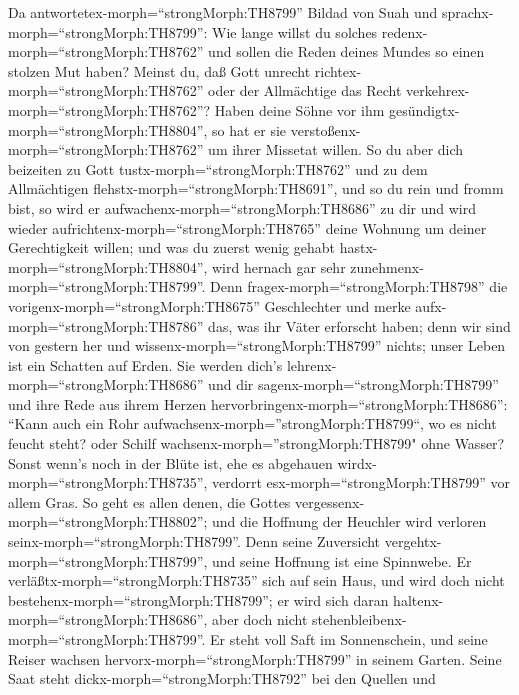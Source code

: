  Da antwortetex-morph=``strongMorph:TH8799'' Bildad von Suah
und sprachx-morph=``strongMorph:TH8799'':  Wie lange willst
du solches redenx-morph=``strongMorph:TH8762'' und sollen die Reden
deines Mundes so einen stolzen Mut haben?  Meinst du, daß
Gott unrecht richtex-morph=``strongMorph:TH8762'' oder der Allmächtige
das Recht verkehrex-morph=``strongMorph:TH8762''?  Haben
deine Söhne vor ihm gesündigtx-morph=``strongMorph:TH8804'', so hat er
sie verstoßenx-morph=``strongMorph:TH8762'' um ihrer Missetat willen.
 So du aber dich beizeiten zu Gott
tustx-morph=``strongMorph:TH8762'' und zu dem Allmächtigen
flehstx-morph=``strongMorph:TH8691'',  und so du rein und
fromm bist, so wird er aufwachenx-morph=``strongMorph:TH8686'' zu dir
und wird wieder aufrichtenx-morph=``strongMorph:TH8765'' deine Wohnung
um deiner Gerechtigkeit willen;  und was du zuerst wenig
gehabt hastx-morph=``strongMorph:TH8804'', wird hernach gar sehr
zunehmenx-morph=``strongMorph:TH8799''.  Denn
fragex-morph=``strongMorph:TH8798'' die
vorigenx-morph=``strongMorph:TH8675'' Geschlechter und merke
aufx-morph=``strongMorph:TH8786'' das, was ihr Väter erforscht haben;
 denn wir sind von gestern her und
wissenx-morph=``strongMorph:TH8799'' nichts; unser Leben ist ein
Schatten auf Erden.  Sie werden dich's
lehrenx-morph=``strongMorph:TH8686'' und dir
sagenx-morph=``strongMorph:TH8799'' und ihre Rede aus ihrem Herzen
hervorbringenx-morph=``strongMorph:TH8686'':  ``Kann auch
ein Rohr aufwachsenx-morph=''strongMorph:TH8799``, wo es nicht feucht
steht? oder Schilf wachsenx-morph=''strongMorph:TH8799" ohne Wasser?
 Sonst wenn's noch in der Blüte ist, ehe es abgehauen
wirdx-morph=``strongMorph:TH8735'', verdorrt
esx-morph=``strongMorph:TH8799'' vor allem Gras.  So geht
es allen denen, die Gottes vergessenx-morph=``strongMorph:TH8802''; und
die Hoffnung der Heuchler wird verloren
seinx-morph=``strongMorph:TH8799''.  Denn seine Zuversicht
vergehtx-morph=``strongMorph:TH8799'', und seine Hoffnung ist eine
Spinnwebe.  Er verläßtx-morph=``strongMorph:TH8735'' sich
auf sein Haus, und wird doch nicht
bestehenx-morph=``strongMorph:TH8799''; er wird sich daran
haltenx-morph=``strongMorph:TH8686'', aber doch nicht
stehenbleibenx-morph=``strongMorph:TH8799''.  Er steht voll
Saft im Sonnenschein, und seine Reiser wachsen
hervorx-morph=``strongMorph:TH8799'' in seinem Garten. 
Seine Saat steht dickx-morph=``strongMorph:TH8792'' bei den Quellen und
